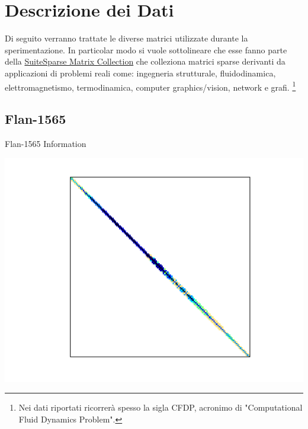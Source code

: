 \section{Descrizione dei Dati} %
Di seguito verranno trattate le diverse matrici utilizzate durante la sperimentazione. In particolar modo si vuole sottolineare che esse fanno parte della \href{
https://sparse.tamu.edu/}{SuiteSparse Matrix Collection} che colleziona matrici sparse derivanti da
applicazioni di problemi reali come: ingegneria strutturale, fluidodinamica, elettromagnetismo,
termodinamica, computer graphics/vision, network e grafi. \footnote{Nei dati riportati ricorrerà spesso la sigla CFDP, acronimo di "Computational Fluid Dynamics Problem".}

\subsection{Flan-1565}
\begin{table}[h!]
	\begin{minipage}{0.5\linewidth}
		\caption{Flan-1565 Information}
		\label{table:Flan-1565}
		\centering
        
	\end{minipage}\hfill
	\begin{minipage}{0.45\linewidth}
		\centering
		\includegraphics[width=1\textwidth]{figs/Flan_1565.png}
		\label{fig:Flan-1565}
	\end{minipage}
\end{table}

